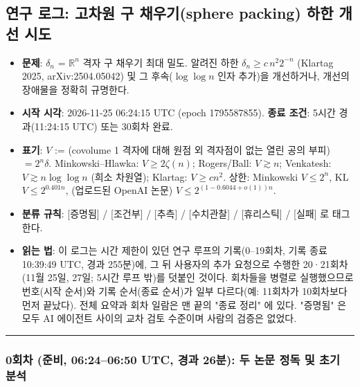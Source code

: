 \hypertarget{uxc5f0uxad6c-uxb85cuxadf8-uxace0uxcc28uxc6d0-uxad6c-uxcc44uxc6b0uxae30sphere-packing-uxd558uxd55c-uxac1cuxc120-uxc2dcuxb3c4}{%
\subsection*{연구 로그: 고차원 구 채우기(sphere packing) 하한 개선 시도}\label{uxc5f0uxad6c-uxb85cuxadf8-uxace0uxcc28uxc6d0-uxad6c-uxcc44uxc6b0uxae30sphere-packing-uxd558uxd55c-uxac1cuxc120-uxc2dcuxb3c4}}

\begin{itemize}
\tightlist
\item
  \textbf{문제}: \(\delta_n\) = \(\mathbb{R}^n\) 격자 구 채우기 최대 밀도. 알려진 하한 \(\delta_n \ge c\,n^2 2^{-n}\) (Klartag 2025, arXiv:2504.05042) 및 그 후속(\(\log\log n\) 인자 추가)을 개선하거나, 개선의 장애물을 정확히 규명한다.
\item
  \textbf{시작 시각}: 2026-11-25 06:24:15 UTC (epoch 1795587855). \textbf{종료 조건}: 5시간 경과(11:24:15 UTC) 또는 30회차 완료.
\item
  \textbf{표기}: \(V\) := (covolume 1 격자에 대해 원점 외 격자점이 없는 열린 공의 부피) \(= 2^n\delta\). Minkowski--Hlawka: \(V\ge 2\zeta(n)\); Rogers/Ball: \(V\gtrsim n\); Venkatesh: \(V\gtrsim n\log\log n\) (희소 차원열); Klartag: \(V\ge cn^2\). 상한: Minkowski \(V\le 2^n\), KL \(V\le 2^{0.401n}\), (업로드된 OpenAI 논문) \(V\le 2^{(1-0.6044+o(1))n}\).
\item
  \textbf{분류 규칙}: {[}증명됨{]} / {[}조건부{]} / {[}추측{]} / {[}수치관찰{]} / {[}휴리스틱{]} / {[}실패{]} 로 태그한다.
\item
  \textbf{읽는 법}: 이 로그는 시간 제한이 있던 연구 루프의 기록(0--19회차, 기록 종료 10:39:49 UTC, 경과 255분)에, 그 뒤 사용자의 추가 요청으로 수행한 20·21회차(11월 25일, 27일; 5시간 루프 밖)를 덧붙인 것이다. 회차들을 병렬로 실행했으므로 번호(시작 순서)와 기록 순서(종료 순서)가 일부 다르다(예: 11회차가 10회차보다 먼저 끝났다). 전체 요약과 회차 일람은 맨 끝의 "종료 정리" 에 있다. "증명됨" 은 모두 AI 에이전트 사이의 교차 검토 수준이며 사람의 검증은 없었다.
\end{itemize}

\begin{center}\rule{0.5\linewidth}{0.5pt}\end{center}

\hypertarget{uxd68cuxcc28-uxc900uxbe44-06240650-utc-uxacbduxacfc-26uxbd84-uxb450-uxb17cuxbb38-uxc815uxb3c5-uxbc0f-uxcd08uxae30-uxbd84uxc11d}{%
\subsubsection*{0회차 (준비, 06:24--06:50 UTC, 경과 26분): 두 논문 정독 및 초기 분석}\label{uxd68cuxcc28-uxc900uxbe44-06240650-utc-uxacbduxacfc-26uxbd84-uxb450-uxb17cuxbb38-uxc815uxb3c5-uxbc0f-uxcd08uxae30-uxbd84uxc11d}}


